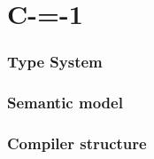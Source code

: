 \section{C-=-1}

\begin{frame}
    \frametitle{Type System}

    

\end{frame}

\begin{frame}
    \frametitle{Semantic model}

    

\end{frame}

\begin{frame}
    \frametitle{Compiler structure}

    

\end{frame}
